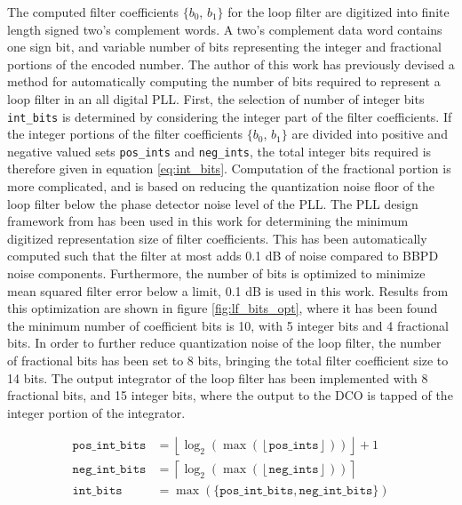 			The computed filter coefficients $\{b_0$, $b_1\}$ for the loop filter are digitized into finite length signed two's complement words. A two's complement data word contains one sign bit, and variable number of bits representing the integer and fractional portions of the encoded number. The author of this work has previously devised a method \cite{Me} for automatically computing the number of bits required to represent a loop filter in an all digital PLL. First, the selection of number of integer bits \texttt{int\_bits} is determined by considering the integer part of the filter coefficients. If the integer portions of the filter coefficients $\{b_0$, $b_1\}$ are divided into positive and negative valued sets \texttt{pos\_ints} and \texttt{neg\_ints}, the total integer bits required is therefore given in equation \ref{eq:int_bits}. Computation of the fractional portion is more complicated, and is based on reducing the quantization noise floor of the loop filter below the phase detector noise level of the PLL. The PLL design framework from \cite{Me} has been used in this work for determining the minimum digitized representation size of filter coefficients. This has been automatically computed such that the filter at most adds 0.1 dB of noise compared to BBPD noise components. Furthermore, the number of bits is optimized to minimize mean squared filter error below a limit, 0.1 dB is used in this work. Results from this optimization are shown in figure \ref{fig:lf_bits_opt}, where it has been found the minimum number of coefficient bits is 10, with 5 integer bits and 4 fractional bits. In order to further reduce quantization noise of the loop filter, the number of fractional bits has been set to 8 bits, bringing the total filter coefficient size to 14 bits. The output integrator of the loop filter has been implemented with 8 fractional bits, and 15 integer bits, where the output to the DCO is tapped of the integer portion of the integrator.

			\begin{align}
				\mathtt{pos\_int\_bits} &= \left\lfloor \log_2\left(\max\left(\left\lfloor \mathtt{pos\_ints} \right\rfloor\right)\right) \right\rfloor +1\\
				\mathtt{neg\_int\_bits} &= \left\lceil \log_2\left(\max\left(\left\lfloor \mathtt{neg\_ints} \right\rfloor\right)\right) \right\rceil\\
				\mathtt{int\_bits} &= \max(\mathtt{\{pos\_int\_bits}, \mathtt{neg\_int\_bits}\})\label{eq:int_bits}
			\end{align}


